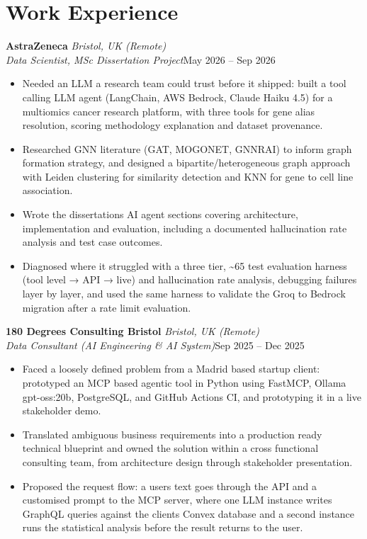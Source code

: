 \documentclass[a4paper,11pt]{article}
\newcommand{\role}[4]{%
  \textbf{#1}{\color{muted}\,\textperiodcentered\,\textit{#2}}\\
  \textit{#4}\hfill{\color{muted}#3}\par}
\newcommand{\gap}{\vspace{5pt}}
\begin{document}
\section{Work Experience}
\role{AstraZeneca}{Bristol, UK (Remote)}{May 2026 – Sep 2026}{Data Scientist, MSc Dissertation Project}
\begin{itemize}
  \item Needed an LLM a research team could trust before it shipped: built a tool calling LLM agent (LangChain, AWS Bedrock, Claude Haiku 4.5) for a multiomics cancer research platform, with three tools for gene alias resolution, scoring methodology explanation and dataset provenance.
  \item Researched GNN literature (GAT, MOGONET, GNNRAI) to inform graph formation strategy, and designed a bipartite/heterogeneous graph approach with Leiden clustering for similarity detection and KNN for gene to cell line association.
  \item Wrote the dissertation\textquotesingle{}s AI agent sections covering architecture, implementation and evaluation, including a documented hallucination rate analysis and test case outcomes.
  \item Diagnosed where it struggled with a three tier, \textasciitilde{}65 test evaluation harness (tool level → API → live) and hallucination rate analysis, debugging failures layer by layer, and used the same harness to validate the Groq to Bedrock migration after a rate limit evaluation.
\end{itemize}
\gap
{}
\role{180 Degrees Consulting Bristol}{Bristol, UK (Remote)}{Sep 2025 – Dec 2025}{Data Consultant (AI Engineering \& AI System)}
\begin{itemize}
  \item Faced a loosely defined problem from a Madrid based startup client: prototyped an MCP based agentic tool in Python using FastMCP, Ollama gpt-oss:20b, PostgreSQL, and GitHub Actions CI, and prototyping it in a live stakeholder demo.
  \item Translated ambiguous business requirements into a production ready technical blueprint and owned the solution within a cross functional consulting team, from architecture design through stakeholder presentation.
  \item Proposed the request flow: a user\textquotesingle{}s text goes through the API and a customised prompt to the MCP server, where one LLM instance writes GraphQL queries against the client\textquotesingle{}s Convex database and a second instance runs the statistical analysis before the result returns to the user.
\end{itemize}
\end{document}

